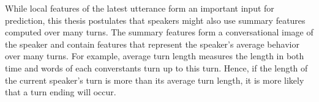 While local features of the latest utterance form an important input for prediction, this thesis postulates that speakers might also use summary features computed over many turns. The summary features form a conversational image of the speaker and contain features that represent the speaker's average behavior over many turns. For example, average turn length measures the length in both time and words of each converstants turn up to this turn. Hence, if the length of the current speaker's turn is more than its average turn length, it is more likely that a turn ending will occur.






